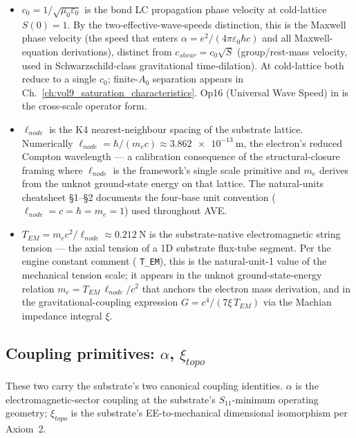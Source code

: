 \begin{itemize}
    \item $c_0 = 1/\sqrt{\mu_0\varepsilon_0}$ is the bond LC propagation phase velocity at cold-lattice $S(0) = 1$. By the two-effective-wave-speeds distinction, this is the Maxwell phase velocity (the speed that enters $\alpha = e^2/(4\pi\varepsilon_0\hbar c)$ and all Maxwell-equation derivations), distinct from $c_{shear} = c_0\sqrt{S}$ (group/rest-mass velocity, used in Schwarzschild-class gravitational time-dilation). At cold-lattice both reduce to a single $c_0$; finite-$A_0$ separation appears in Ch.~\ref{ch:vol9_saturation_characteristics}. Op16 (Universal Wave Speed) in  is the cross-scale operator form.
    \item $\ell_{node}$ is the K4 nearest-neighbour spacing of the substrate lattice. Numerically $\ell_{node} = \hbar/(m_e c) \approx \qty{3.862e-13}{\metre}$, the electron's reduced Compton wavelength --- a calibration consequence of the structural-closure framing where $\ell_{node}$ is the framework's single scale primitive and $m_e$ derives from the unknot ground-state energy on that lattice. The natural-units cheatsheet \S 1--\S 2 documents the four-base unit convention ($\ell_{node} = c = \hbar = m_e = 1$) used throughout AVE.
    \item $T_{EM} = m_e c^2 / \ell_{node} \approx \qty{0.212}{\newton}$ is the substrate-native electromagnetic string tension --- the axial tension of a 1D substrate flux-tube segment. Per the engine constant comment ( \texttt{T\_EM}), this is the natural-unit-1 value of the mechanical tension scale; it appears in the unknot ground-state-energy relation $m_e = T_{EM}\,\ell_{node}/c^2$ that anchors the electron mass derivation, and in the gravitational-coupling expression $G = c^4/(7\xi\,T_{EM})$ via the Machian impedance integral $\xi$.
\end{itemize}

\subsection{Coupling primitives: $\alpha$, $\xi_{topo}$}
\label{subsec:vol9_dc_coupling_primitives}

These two carry the substrate's two canonical coupling identities. $\alpha$ is the electromagnetic-sector coupling at the substrate's $S_{11}$-minimum operating geometry; $\xi_{topo}$ is the substrate's EE-to-mechanical dimensional isomorphism per Axiom~2.

